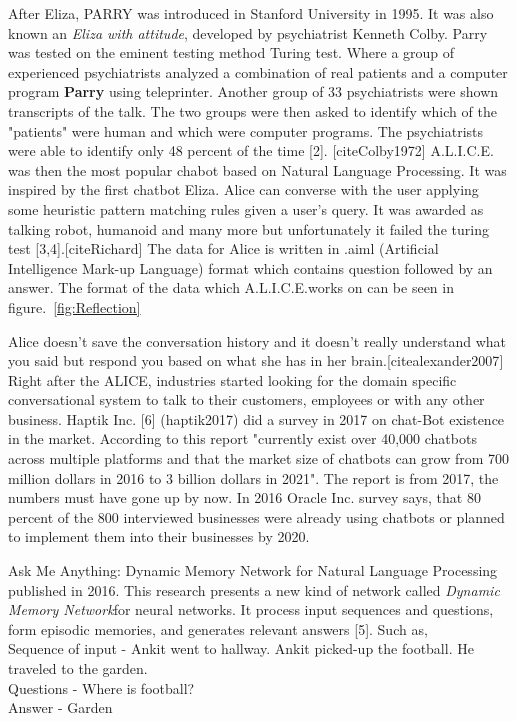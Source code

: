 \documentclass[a4paper,12pt]{article}
\begin{document}
\bigskip

After Eliza, PARRY was introduced in Stanford University in 1995. It was also known an \textit{Eliza with attitude}, developed by psychiatrist Kenneth Colby. Parry was tested on the eminent testing method Turing test. Where a group of experienced psychiatrists analyzed a combination of real patients and a computer program \textbf{Parry} using teleprinter. Another group of 33 psychiatrists were shown transcripts of the talk. The two groups were then asked to identify which of the "patients" were human and which were computer programs. The psychiatrists were able to identify only 48 percent of the time [2]. [cite{Colby1972}]
A.L.I.C.E. was then the most popular chabot based on Natural Language Processing. It was inspired by the first chatbot Eliza. Alice can converse with the user applying some heuristic pattern matching rules given a user's query. It was awarded as talking robot, humanoid and many more but unfortunately it failed the turing test [3,4].[cite{Richard}] The data for Alice is written in .aiml (Artificial Intelligence Mark-up Language) format which contains question followed by an answer. The format of the data which A.L.I.C.E.works on can be seen in figure.~\ref{fig:Reflection}
\bigskip

Alice doesn't save the conversation history and it doesn't really understand what you said but respond you based on what she has in her brain.[cite{alexander2007}] Right after the ALICE, industries started looking for the domain specific conversational system to talk to their customers, employees or with any other business. Haptik Inc. [6] (haptik2017) did a survey in 2017 on chat-Bot existence in the market. According to this report "currently exist over 40,000 chatbots across multiple platforms and that the market size of chatbots can grow from 700 million dollars in 2016 to 3 billion dollars in 2021".  The report is from 2017, the numbers must have gone up by now. In 2016 Oracle Inc. survey says, that 80 percent of the 800 interviewed businesses were already using chatbots or planned to implement them into their businesses by 2020.

\bigskip

Ask Me Anything: Dynamic Memory Network for Natural Language Processing published in 2016. This research presents a new kind of network called \textit{Dynamic Memory Network}for neural networks. It process input sequences and questions, form episodic memories, and generates relevant answers [5]. Such as,\\
Sequence of input - Ankit went to hallway. Ankit picked-up the football. He traveled to the garden.\\
Questions - Where is football?\\
Answer - Garden %
\end{document}
